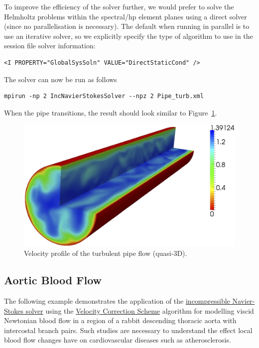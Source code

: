 To improve the efficiency of the solver further, we would prefer to solve
the Helmholtz problems within the spectral/hp element planes using a
direct solver (since no parallelisation is necessary). The default when
running in parallel is to use an iterative solver, so we explicitly
specify the type of algorithm to use in the session file solver
information:
\begin{lstlisting}[style=XMLStyle]
<I PROPERTY="GlobalSysSoln" VALUE="DirectStaticCond" />
\end{lstlisting}

The solver can now be run as follows
\begin{lstlisting}[style=BashInputStyle]
mpirun -np 2 IncNavierStokesSolver --npz 2 Pipe_turb.xml
\end{lstlisting}

When the pipe transitions, the result should look similar to
Figure~\ref{f:incns:turbpipeflow}.

\begin{figure}
\begin{center}
\includegraphics[width=12cm]{Figures/PipeCont.png}
\caption{Velocity profile of the turbulent pipe flow (quasi-3D).}
\label{f:incns:turbpipeflow}
\end{center}
\end{figure}



\subsection{Aortic Blood Flow}
The following example demonstrates the application of the
\hyperref[IncNSsolver]{incompressible Navier-Stokes solver} using the
\hyperref[VCSscheme]{Velocity Correction Scheme} algorithm for modelling viscid
Newtonian blood flow in a region of a rabbit descending thoracic aorta with
intercostal branch pairs. Such studies are necessary to understand the effect
local blood flow changes have on cardiovascular diseases such as
atherosclerosis.

